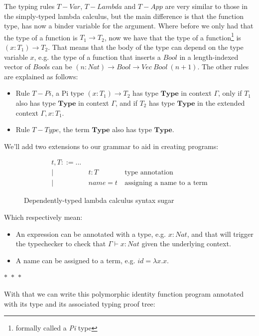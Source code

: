 \documentclass[
       embeddedlogo,
       english,
       lmodern,
       coorientadorbanca,
       noabntexcite
]{ufsc-thesis-rn46-2019}
\theoremstyle{definition}
\newcommand{\fnarrow}{\rightarrow}
\newcommand{\tylit}{\textbf{Type}}
\newcommand{\sep}{\begin{center}$\ast$~$\ast$~$\ast$\end{center}}
\begin{document}
The typing rules $T-Var$, $T-Lambda$ and $T-App$ are very similar to those in the simply-typed lambda calculus, but the main difference is that the function type, has now a binder variable for the argument.
Where before we only had that the type of a function is $T_1 \fnarrow T_2$, now we have that the type of a function\footnote{formally called a \emph{Pi} type} is $(x:T_1) \fnarrow T_2$. That means that the body of the type can depend on the type variable $x$, e.g. the type of a function that inserts a $Bool$ in a length-indexed vector of $Bool$s can be $(n:Nat) \fnarrow Bool \fnarrow Vec\ Bool\ (n+1)$.
The other rules are explained as follows:
\begin{itemize}
       \item Rule $T-Pi$, a Pi type $(x:T_1)\fnarrow T_2$ has type $\tylit$ in context $\Gamma$, only if $T_1$ also has type $\tylit$ in context $\Gamma$, and if $T_2$ has type $\tylit$ in the extended context $\Gamma, x:T_1$.
       \item Rule $T-Type$, the term $\tylit$ also has type $\tylit$.
\end{itemize}

We'll add two extensions to our grammar to aid in creating programs:

\begin{figure}[H]
       \[
              \begin{aligned}
                     t, T ::= ...                                         \\
                     | & \ t : T    & \ \text{type annotation}            \\
                     | & \ name = t & \ \text{assigning a name to a term}
              \end{aligned}
       \]
       \caption{Dependently-typed lambda calculus syntax sugar}
\end{figure}

Which respectively mean:
\begin{itemize}
       \item An expression can be annotated with a type, e.g. $x : Nat$, and that will trigger the typechecker to check that $\Gamma \vdash x : Nat$ given the underlying context.
       \item A name can be assigned to a term, e.g. $id = \lambda x.x$.
\end{itemize}

\sep

With that we can write this polymorphic identity function program annotated with its type and its associated typing proof tree:
\end{document}
